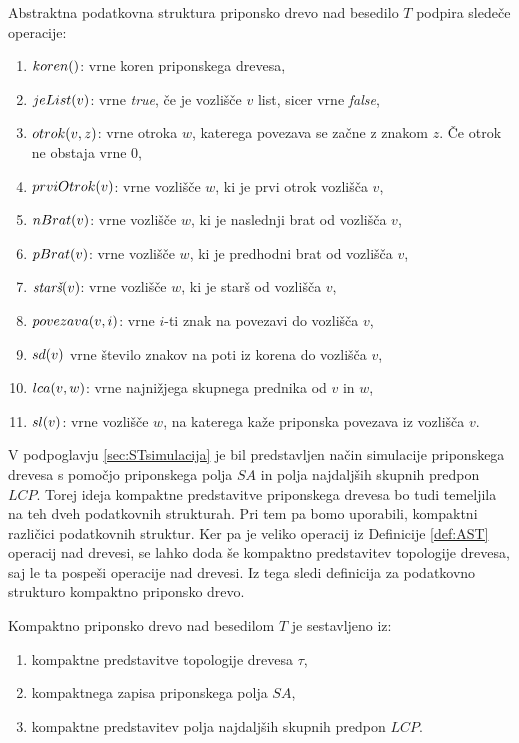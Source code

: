 \begin{defi}\label{def:AST}
    Abstraktna podatkovna struktura priponsko drevo nad besedilo $T$ podpira sledeče operacije:
    \newpage
    \begin{enumerate}
        \item $\Koren$: vrne koren priponskega drevesa,
        \item $\List{v}$: vrne \textit{true}, če je vozlišče $v$ list, sicer vrne \textit{false},
        \item $\Otrok{v}{z}$: vrne otroka $w$, katerega povezava se začne z znakom $z$. Če otrok ne obstaja vrne 0,
        \item $\PrviOtrok{v}$: vrne vozlišče $w$, ki je prvi otrok vozlišča $v$,
        \item $\NBrat{v}$: vrne vozlišče $w$, ki je naslednji brat od vozlišča $v$,
        \item $\PBrat{v}$: vrne vozlišče $w$, ki je predhodni brat od vozlišča $v$,
        \item $\Stars{v}$: vrne vozlišče $w$, ki je starš od vozlišča $v$,
        \item $\Povezava{v}{i}$: vrne $i$-ti znak na povezavi do vozlišča $v$,
        \item $\Sd{v}$ vrne število znakov na poti iz korena do vozlišča $v$,
        \item $\Lca{v}{w}$: vrne najnižjega skupnega prednika od $v$ in $w$,
        \item $\Sl{v}$: vrne vozlišče $w$, na katerega kaže priponska povezava iz vozlišča $v$.
    \end{enumerate}
\end{defi}

V podpoglavju \ref{sec:STsimulacija} je bil predstavljen način simulacije priponskega drevesa s pomočjo priponskega polja $SA$ in polja najdaljših skupnih predpon $LCP$. Torej ideja kompaktne predstavitve priponskega drevesa bo tudi temeljila na teh dveh podatkovnih strukturah. Pri tem pa bomo uporabili, kompaktni različici podatkovnih struktur. Ker pa je veliko operacij iz Definicije \ref{def:AST} operacij nad drevesi, se lahko doda še kompaktno predstavitev topologije drevesa, saj le ta pospeši operacije nad drevesi. Iz tega sledi definicija za podatkovno strukturo kompaktno priponsko drevo.

\begin{defi}
    Kompaktno priponsko drevo nad besedilom $T$ je sestavljeno iz:
    \begin{enumerate}
        \item kompaktne predstavitve topologije drevesa $\tau$,
        \item kompaktnega zapisa priponskega polja $SA$, %
        \item kompaktne predstavitev polja najdaljših skupnih predpon $LCP$.
    \end{enumerate}
\end{defi}

